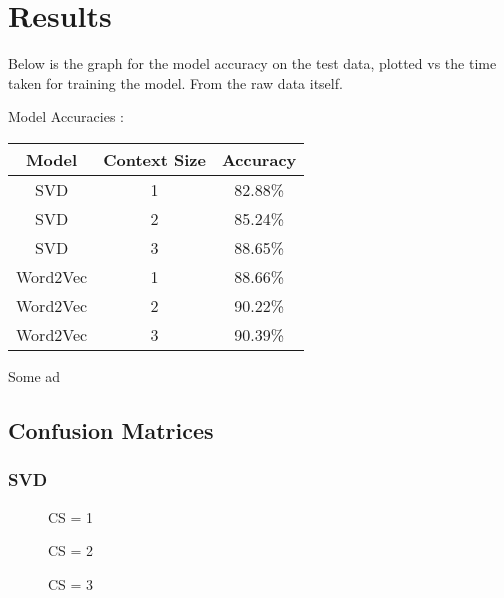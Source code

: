 \section*{Results}
\label{sec:results}

Below is the graph for the model accuracy on the test data, plotted vs the time taken for training the model. From the raw data itself.

Model Accuracies : 


\begin{table}[H]
    \centering
\begin{tabular}{|c|c|c|}
\hline
\textbf{Model} & \textbf{Context Size} & \textbf{Accuracy} \\
\hline
SVD & 1 & 82.88\% \\
\hline
SVD & 2 & 85.24\% \\
\hline
SVD & 3 & 88.65\% \\
\hline
Word2Vec & 1 & 88.66\% \\
\hline
Word2Vec & 2 & 90.22\% \\
\hline
Word2Vec & 3 & 90.39\% \\
\hline
\end{tabular}
\end{table}

Some ad

\subsection*{Confusion Matrices}

\subsubsection{SVD}

\begin{figure}[H]
\centering
\begin{minipage}{0.3\textwidth}
  \centering
  
  \caption{CS = 1}
\end{minipage}%
\begin{minipage}{0.3\textwidth}
  \centering
  
  \caption{CS = 2}
\end{minipage}%
\begin{minipage}{0.3\textwidth}
  \centering
  
  \caption{CS = 3}
\end{minipage}
\end{figure}

